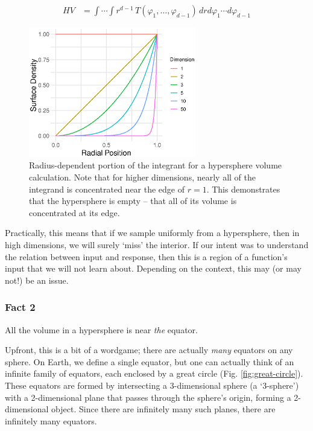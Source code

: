 \documentclass{article}
\begin{document}
\begin{equation*} \begin{aligned}
    HV &= \int\cdots\int r^{d-1}\,
         T(\varphi_{1},\dots,\varphi_{d-1})\,
         dr d\varphi_{1}\cdots d\varphi_{d-1}
\end{aligned} \end{equation*}

\begin{figure}[!ht]
  \centering
  \includegraphics[width=0.65\textwidth]{../../images/surface_density}
  \caption{Radius-dependent portion of the integrant for a hypersphere volume
    calculation. Note that for higher dimensions, nearly all of the integrand is
    concentrated near the edge of $r=1$. This demonstrates that the hypersphere
    is empty -- that all of its volume is concentrated at its edge.}
  \label{fig:hypervolume}
\end{figure}

Practically, this means that if we sample uniformly from a hypersphere, then in
high dimensions, we will surely `miss' the interior. If our intent was to
understand the relation between input and response, then this is a region of a
function's input that we will not learn about. Depending on the context, this
may (or may not!) be an issue.

\clearpage
\subsubsection{Fact 2} All the volume in a hypersphere is near
\emph{the} equator.

\bigskip
Upfront, this is a bit of a wordgame; there are actually \emph{many} equators on
any sphere. On Earth, we define a single equator, but one can actually think of
an infinite family of equators, each enclosed by a great circle (Fig.
\ref{fig:great-circle}). These equators are formed by intersecting a
3-dimensional sphere (a `3-sphere') with a 2-dimensional plane that passes
through the sphere's origin, forming a 2-dimensional object. Since there are
infinitely many such planes, there are infinitely many equators.
\end{document}
